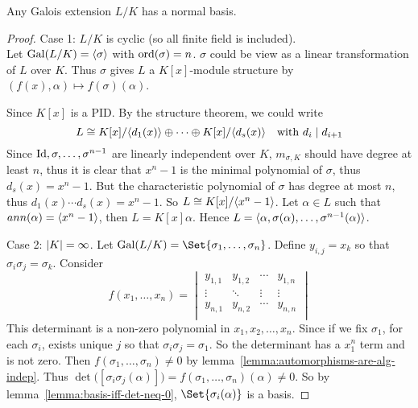 \begin{theorem}
  Any Galois extension $L/K$ has a normal basis.

  \begin{proof}
    Case 1: $L/K$ is cyclic (so all finite field is included). \\
    Let $\operatorname{Gal}(L/K) = \langle \sigma \rangle$ with $\operatorname{ord}(\sigma) = n$. $\sigma$ could be view as
    a linear transformation of $L$ over $K$. Thus $\sigma$ gives $L$ a
    $K[x]$-module structure by $(f(x), \alpha) \mapsto f(\sigma)(\alpha)$.

    Since $K[x]$ is a PID. By the structure theorem, we could write
    \[ L \cong {K[x]}/{\langle d_1(x)\rangle} \oplus \dots \oplus {K[x]}/{\langle d_s(x)\rangle} \quad
      \text{with } d_i \mid d_{i+1} \]
    Since ${\rm Id}, \sigma, \dots, \sigma^{n-1}$ are linearly independent over $K$,
    $m_{\sigma, K}$ should have degree at least $n$, thus it is clear that $x^n - 1$
    is the minimal polynomial of $\sigma$, thus $d_s(x) = x^n - 1$. But
    the characteristic polynomial of $\sigma$ has degree at most $n$, thus
    $d_1(x) \dotsm d_s(x) = x^n - 1$. So $L \cong K[x] / \langle x^n - 1\rangle$.
    Let $\alpha \in L$ such that $ann(\alpha) = \langle x^n - 1\rangle$, then $L = K[x]\alpha$.
    Hence $L = \langle\alpha, \sigma(\alpha), \dots, \sigma^{n-1}(\alpha)\rangle$.

    Case 2: $\lvert K\rvert = \infty$. Let $\Gal(L/K) = \Set{\sigma_1, \dots, \sigma_n}$.
    Define $y_{i, j} = x_k$ so that $\sigma_i \sigma_j = \sigma_{k}$.
    Consider
    \[
      f(x_1, \dots, x_n) = \begin{vmatrix}
        y_{1, 1} & y_{1, 2} & \cdots & y_{1, n} \\
        \vdots & \ddots & \vdots & \vdots \\
        y_{n, 1} & y_{n, 2} & \cdots & y_{n, n} \\
      \end{vmatrix}
    \]
    This determinant is a non-zero polynomial in $x_1, x_2, \dots, x_n$.
    Since if we fix $\sigma_1$, for each $\sigma_i$, exists unique $j$ so that $\sigma_i \sigma_j = \sigma_1$.
    So the determinant has a $x_1^n$ term and is not zero.
    Then $f(\sigma_1, \dots, \sigma_n) \neq 0$ by lemma~\ref{lemma:automorphisms-are-alg-indep}.
    Thus $\det\big([\sigma_{i}\sigma_{j}(\alpha)] \big) = f(\sigma_1, \dots, \sigma_n)(\alpha) \neq 0$.
    So by lemma~\ref{lemma:basis-iff-det-neq-0}, $\Set{ \sigma_i(\alpha) }$ is a basis.
  \end{proof}
\end{theorem}
